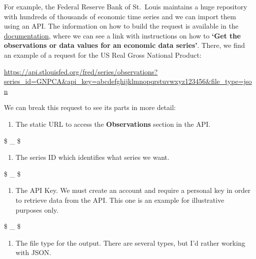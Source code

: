 \documentclass[
]{book}
\providecommand{\tightlist}{%
  \setlength{\itemsep}{0pt}\setlength{\parskip}{0pt}}
\begin{document}
For example, the Federal Reserve Bank of St.~Louis maintains a huge repository with hundreds of thousands of economic time series and we can import them using an API. The information on how to build the request is available in the \href{https://fred.stlouisfed.org/docs/api/fred/}{documentation}, where we can see a link with instructions on how to \textbf{`Get the observations or data values for an economic data series'}. There, we find an example of a request for the US Real Gross National Product:

\url{https://api.stlouisfed.org/fred/series/observations?series_id=GNPCA\&api_key=abcdefghijklmnopqrstuvwxyz123456\&file_type=json}

We can break this request to see its parts in more detail:

\begin{enumerate}
\def\labelenumi{\arabic{enumi}.}
\tightlist
\item
  The static URL to access the \textbf{Observations} section in the API.
\end{enumerate}

\$ \_ \$

\begin{enumerate}
\def\labelenumi{\arabic{enumi}.}
\setcounter{enumi}{1}
\tightlist
\item
  The series ID which identifies what series we want.
\end{enumerate}

\$ \_ \$

\begin{enumerate}
\def\labelenumi{\arabic{enumi}.}
\setcounter{enumi}{2}
\tightlist
\item
  The API Key. We must create an account and require a personal key in order to retrieve data from the API. This one is an example for illustrative purposes only.
\end{enumerate}

\$ \_ \$

\begin{enumerate}
\def\labelenumi{\arabic{enumi}.}
\setcounter{enumi}{3}
\tightlist
\item
  The file type for the output. There are several types, but I'd rather working with JSON.
\end{enumerate}
\end{document}
